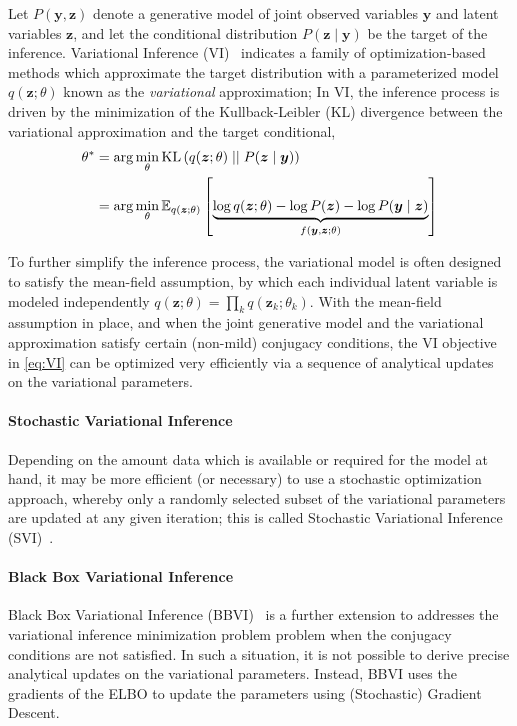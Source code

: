 \documentclass[11pt]{article}
\begin{document}
Let $P(\bm y, \bm z)$ denote a generative model of joint observed variables
$\bm y$ and latent variables $\bm z$, and let the conditional distribution
$P(\bm z\mid \bm y)$ be the target of the inference.  Variational Inference
(VI)~\cite{blei_variational_2017} indicates a family of optimization-based
methods which approximate the target distribution with a parameterized model
$q(\bm z; \theta)$ known as the \emph{variational} approximation;  In VI, the
inference process is driven by the minimization of the Kullback-Leibler (KL)
divergence between the variational approximation and the target conditional,
%
\begin{align}
  \theta^* &= \arg\min_\theta {\operatorname{KL}}\left( q(\bm z; \theta) \mid\mid P(\bm z\mid
  \bm y) \right) \\
  &= \arg\min_\theta {\mathbb{E}}_{q(\bm z; \theta)}\left[ \underbrace{ \log q(\bm z;
  \theta) - \log P(\bm z) -\log P(\bm y\mid \bm z) }_{f(\bm y, \bm z; \theta)}
  \right] \label{eq:VI}
\end{align}


To further simplify the inference process, the variational model is often
designed to satisfy the mean-field assumption, by which each individual latent
variable is modeled independently $q(\bm z; \theta) = \prod_k q(\bm z_k;
\theta_k)$.  With the mean-field assumption in place, and when the joint
generative model and the variational approximation satisfy certain (non-mild)
conjugacy conditions, the VI objective in \cref{eq:VI} can be optimized very
efficiently via a sequence of analytical updates on the variational parameters.

\paragraph{Stochastic Variational Inference}  Depending on the amount data
which is available or required for the model at hand, it may be more efficient
(or necessary) to use a stochastic optimization approach, whereby only
a randomly selected subset of the variational parameters are updated at any
given iteration; this is called Stochastic Variational Inference
(SVI)~\cite{hoffman_stochastic_2013}.

\paragraph{Black Box Variational Inference}  Black Box Variational Inference
(BBVI)~\cite{ranganath_black_2014} is a further extension to addresses the
variational inference minimization problem problem when the conjugacy
conditions are not satisfied.  In such a situation, it is not possible to
derive precise analytical updates on the variational parameters.  Instead, BBVI
uses the gradients of the ELBO to update the parameters using (Stochastic)
Gradient Descent.
\end{document}
